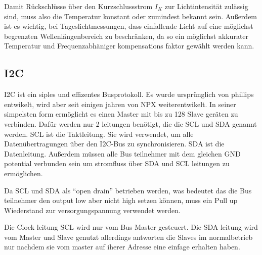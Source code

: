 \noindent Damit Rückschlüsse über den Kurzschlussstrom $I_K$ zur Lichtintensität zulässig sind, muss also die Temperatur konstant oder zumindest bekannt sein.
Außerdem ist es wichtig, bei Tageslichtmessungen, dass einfallende Licht auf eine möglichst begrenzten Wellenlängenbereich zu beschränken, da so ein möglichst akkurater Temperatur und Frequenzabhäniger kompensations faktor gewählt werden kann.
\subsection{I2C}
I2C ist ein siples und effizentes Busprotokoll.
Es wurde ursprünglich von phillips entwikelt, wird aber seit einigen jahren von NPX weiterentwikelt.
In seiner simpelsten form ermöglicht es einen Master mit bis zu 128 Slave geräten zu verbinden.
Dafür werden nur 2 leitungen benötigt, die die SCL und SDA genannt werden. SCL ist die Taktleitung. Sie wird verwendet, um alle Datenübertragungen über den I2C-Bus zu synchronisieren. SDA ist die Datenleitung.
Außerdem müssen alle Bus teilnehmer mit dem gleichen GND potential verbunden sein um stromfluss über SDA und SCL leitungen zu ermöglichen.


Da SCL und SDA als “open drain” betrieben werden, was bedeutet das die Bus teilnehmer den output low aber nicht high setzen können, muss ein Pull up Wiederstand zur versorgungspannung verwendet werden.

Die Clock leitung SCL wird nur vom Bus Master gesteuert.
Die SDA leitung wird vom Master und Slave genutzt allerdings antworten die Slaves im normalbetrieb nur nachdem sie vom master auf iherer Adresse eine einfage erhalten haben. 
